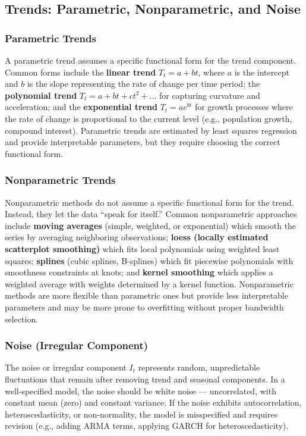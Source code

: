 \documentclass[11pt,a4paper]{article}
\begin{document}
\subsection{Trends: Parametric, Nonparametric, and Noise}

\subsubsection{Parametric Trends}
A parametric trend assumes a specific functional form for the trend component. Common forms include the \textbf{linear trend} $T_t = a + bt$, where $a$ is the intercept and $b$ is the slope representing the rate of change per time period; the \textbf{polynomial trend} $T_t = a + bt + ct^2 + \ldots$ for capturing curvature and acceleration; and the \textbf{exponential trend} $T_t = a e^{bt}$ for growth processes where the rate of change is proportional to the current level (e.g., population growth, compound interest). Parametric trends are estimated by least squares regression and provide interpretable parameters, but they require choosing the correct functional form.

\subsubsection{Nonparametric Trends}
Nonparametric methods do not assume a specific functional form for the trend. Instead, they let the data ``speak for itself.'' Common nonparametric approaches include \textbf{moving averages} (simple, weighted, or exponential) which smooth the series by averaging neighboring observations; \textbf{loess (locally estimated scatterplot smoothing)} which fits local polynomials using weighted least squares; \textbf{splines} (cubic splines, B-splines) which fit piecewise polynomials with smoothness constraints at knots; and \textbf{kernel smoothing} which applies a weighted average with weights determined by a kernel function. Nonparametric methods are more flexible than parametric ones but provide less interpretable parameters and may be more prone to overfitting without proper bandwidth selection.

\subsubsection{Noise (Irregular Component)}
The noise or irregular component $I_t$ represents random, unpredictable fluctuations that remain after removing trend and seasonal components. In a well-specified model, the noise should be white noise --- uncorrelated, with constant mean (zero) and constant variance. If the noise exhibits autocorrelation, heteroscedasticity, or non-normality, the model is misspecified and requires revision (e.g., adding ARMA terms, applying GARCH for heteroscedasticity).
\end{document}

